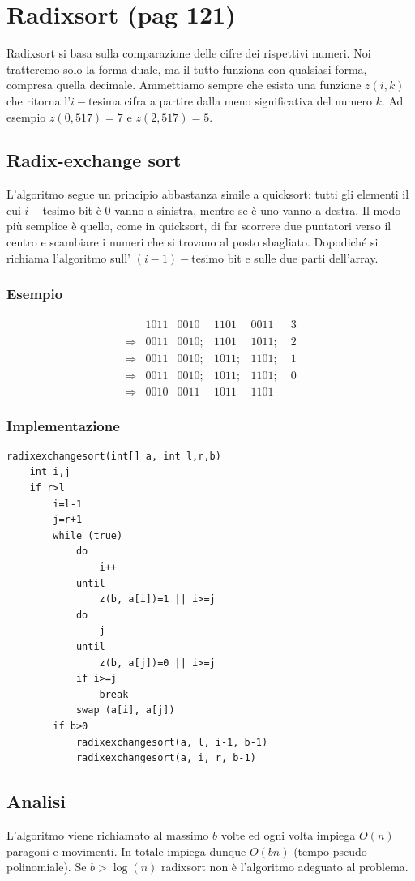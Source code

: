\documentclass[a4paper]{book}
\begin{document}
\section{Radixsort (pag 121)}
Radixsort si basa sulla comparazione delle cifre dei rispettivi numeri. Noi tratteremo solo la forma duale, ma il tutto funziona con qualsiasi forma, compresa quella decimale. Ammettiamo sempre che esista una funzione $z(i,k)$ che ritorna l'$i-$tesima cifra a partire dalla meno significativa del numero $k$. Ad esempio $z(0,517)=7$ e $z(2, 517)=5$.
\subsection{Radix-exchange sort}
L'algoritmo segue un principio abbastanza simile a quicksort: tutti gli elementi il cui $i-$tesimo bit è 0 vanno a sinistra, mentre se è uno vanno a destra. Il modo più semplice è quello, come in quicksort, di far scorrere due puntatori verso il centro e scambiare i numeri che si trovano al posto sbagliato. Dopodiché si richiama l'algoritmo sull' $(i-1)-$tesimo bit e sulle due parti dell'array.
\subsubsection*{Esempio}
\[\begin{array}{*{20}{c}}
{}&{1011}&{0010}&{1101}&{0011}&{|3}\\
{\Rightarrow}&{0011}&{0010;}&{1101}&{1011;}&{|2}\\
{\Rightarrow}&{0011}&{0010;}&{1011;}&{1101;}&{|1}\\
{\Rightarrow}&{0011}&{0010;}&{1011;}&{1101;}&{|0}\\
{\Rightarrow}&{0010}&{0011}&{1011}&{1101}
\end{array}\]
\subsubsection*{Implementazione}
\begin{lstlisting}
radixexchangesort(int[] a, int l,r,b)
	int i,j
	if r>l
		i=l-1
		j=r+1
		while (true)
			do
				i++
			until
				z(b, a[i])=1 || i>=j
			do
				j--
			until
				z(b, a[j])=0 || i>=j
			if i>=j
				break
			swap (a[i], a[j])
		if b>0
			radixexchangesort(a, l, i-1, b-1)
			radixexchangesort(a, i, r, b-1)						
\end{lstlisting}
\subsection*{Analisi}
L'algoritmo viene richiamato al massimo $b$ volte ed ogni volta impiega $O(n)$ paragoni e movimenti. In totale impiega dunque $O(bn)$ (tempo pseudo polinomiale). Se $b> \log (n)$ radixsort non è l'algoritmo adeguato al problema.
\end{document}
